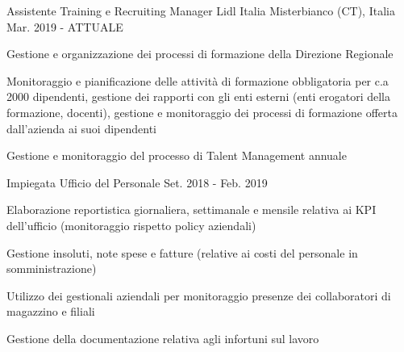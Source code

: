 


\begin{cventries}



  \cventry
	{Assistente Training e Recruiting Manager} %
	{Lidl Italia} %
	{Misterbianco (CT), Italia} %
	{Mar. 2019 - ATTUALE} %
	{
	  \begin{cvitems}
		\item {Gestione e organizzazione dei processi di formazione della Direzione Regionale}
		\item {Monitoraggio e pianificazione delle attività di formazione obbligatoria per c.a 2000 dipendenti, gestione dei rapporti con gli enti esterni (enti erogatori della formazione, docenti), gestione e monitoraggio dei processi di formazione offerta dall’azienda ai suoi dipendenti}
		\item {Gestione e monitoraggio del processo di Talent Management annuale}
	  \end{cvitems}
	}
	

  \cventry
	{Impiegata Ufficio del Personale} %
	{} %
	{} %
	{Set. 2018 - Feb. 2019} %
	{
	  \begin{cvitems}
		\item {Elaborazione reportistica giornaliera, settimanale e mensile relativa ai KPI dell'ufficio (monitoraggio rispetto policy aziendali)}
		\item {Gestione insoluti, note spese e fatture (relative ai costi del personale in somministrazione)}
		\item {Utilizzo dei gestionali aziendali per monitoraggio presenze dei collaboratori di magazzino e filiali}
		\item {Gestione della documentazione relativa agli infortuni sul lavoro}
	  \end{cvitems}
	}


\end{cventries}
